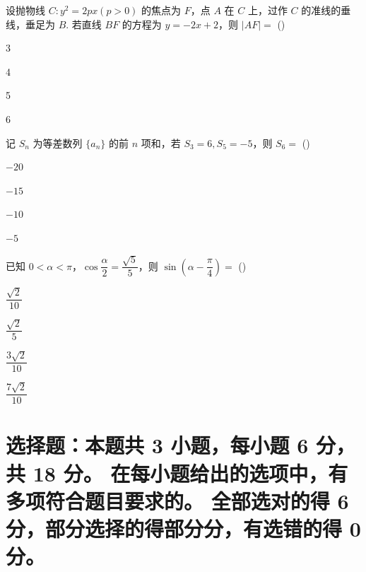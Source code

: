 \documentclass{exam-zh}
\begin{document}

\begin{question}
设抛物线 $C: y^2=2px (p>0)$ 的焦点为 $F$，点 $A$ 在 $C$ 上，过作 $C$ 的准线的垂线，垂足为 $B$. 若直线 $BF$ 的方程为 $y=-2x+2$，则 $|AF|=$
(\hspace{1cm})
\begin{choices}
\item 3
\item 4
\item 5
\item 6
\end{choices}
\end{question}


\begin{question}
记 $S_n$ 为等差数列 $\{a_n\}$ 的前 $n$ 项和，若 $S_3=6, S_5=-5$，则 $S_6=$
(\hspace{1cm})
\begin{choices}
\item $-20$
\item $-15$
\item $-10$
\item $-5$
\end{choices}
\end{question}


\begin{question}
已知 $0<\alpha<\pi$，$\cos \dfrac{\alpha}{2} = \dfrac{\sqrt{5}}{5}$，则 $\sin\left(\alpha-\dfrac{\pi}{4}\right)=$
(\hspace{1cm})
\begin{choices}
\item $\dfrac{\sqrt{2}}{10}$
\item $\dfrac{\sqrt{2}}{5}$
\item $\dfrac{3\sqrt{2}}{10}$
\item $\dfrac{7\sqrt{2}}{10}$
\end{choices}
\end{question}

\section{%
  选择题：本题共 3 小题，每小题 6 分，共 18 分。
  在每小题给出的选项中，有多项符合题目要求的。
  全部选对的得 6 分，部分选择的得部分分，有选错的得 0 分。
}
\end{document}
